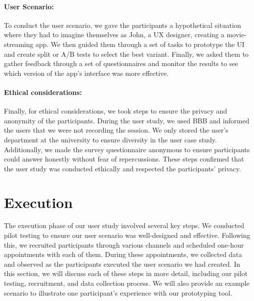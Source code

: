 

\paragraph{User Scenario:}
To conduct the user scenario, we gave the participants a hypothetical situation where they had to imagine themselves as John, a UX designer, creating a movie-streaming app. 
We then guided them through a set of tasks to prototype the UI and create split or A/B tests to select the best variant. 
Finally, we asked them to gather feedback through a set of questionnaires and monitor the results to see which version of the app's interface was more effective.

\paragraph{Ethical considerations:}
Finally, for ethical considerations, we took steps to ensure the privacy and anonymity of the participants. 
During the user study, we used BBB and informed the users that we were not recording the session. 
We only stored the user's department at the university to ensure diversity in the user case study. Additionally, we made the survey questionnaire anonymous to ensure participants could answer honestly without fear of repercussions. These steps confirmed that the user study was conducted ethically and respected the participants' privacy.

\clearpage
\section{Execution}
\label{evaluation:section:execution}
The execution phase of our user study involved several key steps. 
We conducted pilot testing to ensure our user scenario was well-designed and effective. 
Following this, we recruited participants through various channels and scheduled one-hour appointments with each of them. 
During these appointments, we collected data and observed as the participants executed the user scenario we had created. 
In this section, we will discuss each of these steps in more detail, including our pilot testing, recruitment, and data collection process. 
We will also provide an example scenario to illustrate one participant's experience with our prototyping tool.


